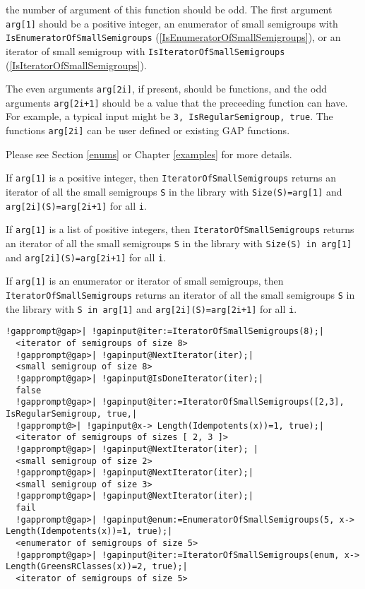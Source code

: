 \documentclass[a4paper,11pt]{report}
\begin{document}
{{{ the number of argument of this function should be odd. The first argument \texttt{arg[1]} should be a positive integer, an enumerator of small semigroups with \texttt{IsEnumeratorOfSmallSemigroups} (\ref{IsEnumeratorOfSmallSemigroups}), or an iterator of small semigroup with \texttt{IsIteratorOfSmallSemigroups} (\ref{IsIteratorOfSmallSemigroups}). 

 The even arguments \texttt{arg[2i]}, if present, should be functions, and the odd arguments \texttt{arg[2i+1]} should be a value that the preceeding function can have. For example, a
typical input might be \texttt{3, IsRegularSemigroup, true}. The functions \texttt{arg[2i]} can be user defined or existing \textsf{GAP} functions.

 Please see Section \ref{enums} or Chapter \ref{examples} for more details. 

 If \texttt{arg[1]} is a positive integer, then \texttt{IteratorOfSmallSemigroups} returns an iterator of all the small semigroups \texttt{S} in the library with \texttt{Size(S)=arg[1]} and \texttt{arg[2i](S)=arg[2i+1]} for all \texttt{i}. 

 If \texttt{arg[1]} is a list of positive integers, then \texttt{IteratorOfSmallSemigroups} returns an iterator of all the small semigroups \texttt{S} in the library with \texttt{Size(S) in arg[1]} and \texttt{arg[2i](S)=arg[2i+1]} for all \texttt{i}. 

 If \texttt{arg[1]} is an enumerator or iterator of small semigroups, then \texttt{IteratorOfSmallSemigroups} returns an iterator of all the small semigroups \texttt{S} in the library with \texttt{S in arg[1]} and \texttt{arg[2i](S)=arg[2i+1]} for all \texttt{i}. 

 
\begin{Verbatim}[commandchars=!@|,fontsize=\small,frame=single,label=Example]
  !gapprompt@gap>| !gapinput@iter:=IteratorOfSmallSemigroups(8);|
  <iterator of semigroups of size 8>
  !gapprompt@gap>| !gapinput@NextIterator(iter);|
  <small semigroup of size 8>
  !gapprompt@gap>| !gapinput@IsDoneIterator(iter);|
  false
  !gapprompt@gap>| !gapinput@iter:=IteratorOfSmallSemigroups([2,3], IsRegularSemigroup, true,|
  !gapprompt@>| !gapinput@x-> Length(Idempotents(x))=1, true);|
  <iterator of semigroups of sizes [ 2, 3 ]>
  !gapprompt@gap>| !gapinput@NextIterator(iter); |
  <small semigroup of size 2>
  !gapprompt@gap>| !gapinput@NextIterator(iter);|
  <small semigroup of size 3>
  !gapprompt@gap>| !gapinput@NextIterator(iter);|
  fail
  !gapprompt@gap>| !gapinput@enum:=EnumeratorOfSmallSemigroups(5, x-> Length(Idempotents(x))=1, true);|
  <enumerator of semigroups of size 5>
  !gapprompt@gap>| !gapinput@iter:=IteratorOfSmallSemigroups(enum, x-> Length(GreensRClasses(x))=2, true);|
  <iterator of semigroups of size 5>
\end{Verbatim}
 }

}}
\end{document}
